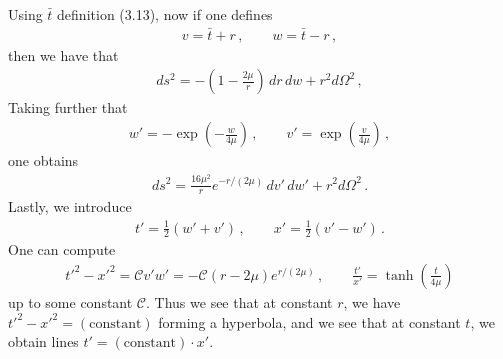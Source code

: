 \documentclass[11pt, onesided]{book}
\theoremstyle{break}
\theoremstyle{break}
\begin{document}
Using $\bar{t}$ definition (3.13), now if one defines
\begin{align*}
v = \bar{t} + r\,,\qquad w = \bar{t} - r\,,
\end{align*}
then we have that
\begin{align*}
ds^2 = -\left( 1 - \frac{2\mu}{r}\right) \,dr\,dw + r^2 d\Omega^2\,,
\end{align*}
Taking further that
\begin{align*}
w' = -\exp\left(- \frac{w}{4\mu} \right)\,,\qquad
v' = \exp\left( \frac{v}{4\mu}\right)\,,
\end{align*}
one obtains
\begin{align*}
ds^2 = \frac{16\mu^2}{r}e^{-r/(2\mu)}\, dv'\,dw' + r^2 d\Omega^2\,.
\end{align*}
Lastly, we introduce
\begin{align*}
t' = \frac{1}{2}(w'+v')\,,\qquad x' = \frac{1}{2}( v'-w')\,.
\end{align*}
One can compute
\begin{align*}
t'^2 -x'^2 =\mathcal{C} v'w' = -\mathcal{C}(r-2\mu)e^{r/(2\mu)}\,,\qquad
\frac{t'}{x'} = \tanh\left( \frac{t}{4\mu}\right)
\end{align*}
up to some constant $\mathcal{C}$. Thus we see that at constant $r$, we have $t'^2 - x'^2 = (\text{constant})$ forming a hyperbola, and we see that at constant $t$, we obtain lines $t' = (\text{constant})\cdot x'$. 
\end{document}
